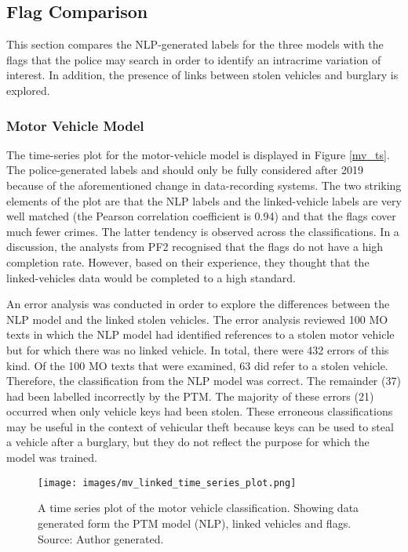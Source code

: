 

\subsection{Flag Comparison} This section compares the NLP-generated labels for the three models with the flags that the police may search in order to identify an intracrime variation of interest. In addition, the presence of links between stolen vehicles and burglary is explored.

\subsubsection{Motor Vehicle Model} The time-series plot for the motor-vehicle model is displayed in Figure \ref{mv_ts}. The police-generated labels and  should only be fully considered after 2019 because of the aforementioned change in data-recording systems. The two striking elements of the plot are that the NLP labels and the linked-vehicle labels are very well matched (the Pearson correlation coefficient is 0.94) and that the flags cover much fewer crimes. The latter tendency is observed across the classifications. In a discussion, the analysts from PF2 recognised that the flags do not have a high completion rate. However, based on their experience, they thought that the linked-vehicles data would be completed to a high standard.

An error analysis was conducted in order to explore the differences between the NLP model and the linked stolen vehicles. The error analysis reviewed 100 MO texts in which the NLP model had identified references to a stolen motor vehicle but for which there was no linked vehicle. In total, there were 432 errors of this kind. Of the 100 MO texts that were examined, 63 did refer to a stolen vehicle. Therefore, the classification from the NLP model was correct. The remainder (37) had been labelled incorrectly by the PTM. The majority of these errors (21) occurred when only vehicle keys had been stolen. These erroneous classifications may be useful in the context of vehicular theft because keys can be used to steal a vehicle after a burglary, but they do not reflect the purpose for which the model was trained. 


\begin{figure}
  \texttt{[image: images/mv\_linked\_time\_series\_plot.png]}
  \caption[Motor vehicle model time series plot]{A time series plot of the motor vehicle classification. Showing data generated form the PTM model (NLP), linked vehicles and flags. Source: Author generated.}
  \label{fig:mv_ts}
\end{figure}

